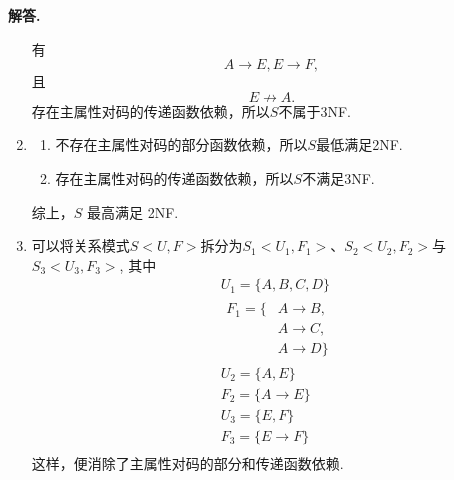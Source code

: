 \documentclass[12pt, oneside]{ctexart}
\numberwithin{figure}{section}
\numberwithin{table}{section}
\newcounter{problemname}
\newenvironment{problem}{\begin{shaded}\stepcounter{problemname}\par\noindent\textbf{题目\arabic{problemname}. }}{\end{shaded}\par}
\newenvironment{solution}{\par\noindent\textbf{解答. }}{\par}
\begin{document}
\begin{solution}
\begin{enumerate}[(1)]
            有$$A\rightarrow E, E\rightarrow F,$$
            且$$E\not\rightarrow A.$$
            存在主属性对码的传递函数依赖，所以$S$不属于3NF.
        \item 
            \begin{enumerate}[$1^\circ$]
                \item 不存在主属性对码的部分函数依赖，所以$S$最低满足2NF.
                \item 存在主属性对码的传递函数依赖，所以$S$不满足3NF.
            \end{enumerate}
            综上，$S$ 最高满足 2NF.
        \item 
            可以将关系模式$S<U, F>$拆分为$S_1<U_1, F_1>$、$S_2<U_2, F_2>$与$S_3<U_3, F_3>$, 其中
            $$
                \begin{aligned}
                    & U_1 = \{A, B, C, D\} \\
                    & \begin{aligned}
                        F_1 = \{ &A\rightarrow B, \\
                        & A\rightarrow C, \\
                        & A\rightarrow D\}
                    \end{aligned} \\
                    & U_2 = \{A, E\} \\
                    & F_2 = \{A \rightarrow E\} \\
                    & U_3 = \{E, F\} \\
                    & F_3 = \{E \rightarrow F\} \\
                \end{aligned}
            $$
            这样，便消除了主属性对码的部分和传递函数依赖.
    \end{enumerate}
\end{solution}






\end{document}
